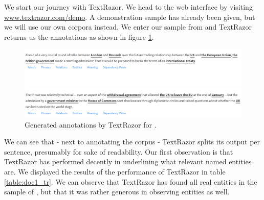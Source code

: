 \documentclass[a4paper, 11pt]{article}
\begin{document}
We start our journey with TextRazor. We head to the web interface by visiting \url{www.textrazor.com/demo}. A demonstration sample has already been given, but we will use our own corpora instead. We enter our sample from \citet{mcgee_2020} and TextRazor returns us the annotations as shown in figure \ref{fig:doc1tr}.

\begin{figure}[h]
	\label{fig:doc1tr}
	\includegraphics[width=\textwidth]{doc1_textrazor.png}
	\caption{Generated annotations by TextRazor for \citet{mcgee_2020}.}
\end{figure}

We can see that - next to annotating the corpus - TextRazor splits its output per sentence, presumably for sake of readability. Our first observation is that TextRazor has performed  decently in underlining what relevant named entities are. We displayed the results of the performance of TextRazor in table \ref{table:doc1_tr}. We can observe that TextRazor has found all real entities in the sample of \citet{mcgee_2020}, but that it was rather generous in observing entities as well.

\begin{table}[h]
	\centering
\caption{Performance report of TextRazor analyzing the \citet{mcgee_2020} sample.}
\label{table:doc1_tr}
\end{table}
\end{document}
